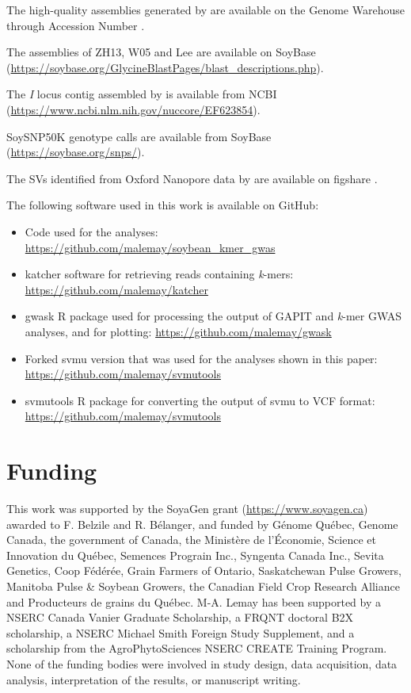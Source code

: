 The high-quality assemblies generated by \cite{liu2020-pangenome} are available
on the Genome Warehouse through Accession Number \citeauthor{PRJCA002030}.

The assemblies of ZH13, W05 and Lee are available on SoyBase
(\url{https://soybase.org/GlycineBlastPages/blast_descriptions.php}).

The \textit{I} locus contig assembled by \cite{tuteja2008} is available from
NCBI (\url{https://www.ncbi.nlm.nih.gov/nuccore/EF623854}).

SoySNP50K genotype calls are available from SoyBase (\url{https://soybase.org/snps/}).

The SVs identified from Oxford Nanopore data by \cite{lemay2022} are available
on figshare \citep{soybean-sv-figshare}.

The following software used in this work is available on GitHub:

\begin{itemize}
	\item Code used for the analyses:
		\url{https://github.com/malemay/soybean_kmer_gwas}
	\item katcher software for retrieving reads containing \textit{k}-mers:
		\url{https://github.com/malemay/katcher}
	\item gwask R package used for processing the output of GAPIT and
		\textit{k}-mer GWAS analyses, and for plotting:
		\url{https://github.com/malemay/gwask}
	\item Forked svmu version that was used for the analyses shown in this
		paper: \url{https://github.com/malemay/svmutools}
	\item svmutools R package for converting the output of svmu to VCF
		format: \url{https://github.com/malemay/svmutools}
\end{itemize}

\section*{Funding}
\label{sv-gwas-funding}

This work was supported by the SoyaGen grant (\url{https://www.soyagen.ca})
awarded to F. Belzile and R. Bélanger, and funded by Génome Québec, Genome
Canada, the government of Canada, the Ministère de l'Économie, Science et
Innovation du Québec, Semences Prograin Inc., Syngenta Canada Inc., Sevita
Genetics, Coop Fédérée, Grain Farmers of Ontario, Saskatchewan Pulse Growers,
Manitoba Pulse \& Soybean Growers, the Canadian Field Crop Research Alliance
and Producteurs de grains du Québec. M-A. Lemay has been supported by a NSERC
Canada Vanier Graduate Scholarship, a FRQNT doctoral B2X scholarship, a NSERC
Michael Smith Foreign Study Supplement, and a scholarship from the
AgroPhytoSciences NSERC CREATE Training Program. None of the funding bodies
were involved in study design, data acquisition, data analysis, interpretation
of the results, or manuscript writing.

